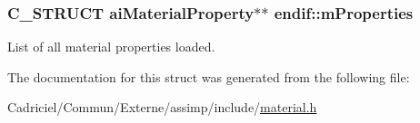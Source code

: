 \subsubsection[{\texorpdfstring{m\+Properties}{mProperties}}]{\setlength{\rightskip}{0pt plus 5cm}C\+\_\+\+S\+T\+R\+U\+CT ai\+Material\+Property$\ast$$\ast$ endif\+::m\+Properties}\hypertarget{structendif_a95295db8cbd37f02553457d84d65068a}{}\label{structendif_a95295db8cbd37f02553457d84d65068a}
List of all material properties loaded. 

The documentation for this struct was generated from the following file\+:\begin{DoxyCompactItemize}
\item 
Cadriciel/\+Commun/\+Externe/assimp/include/\hyperlink{material_8h}{material.\+h}\end{DoxyCompactItemize}
